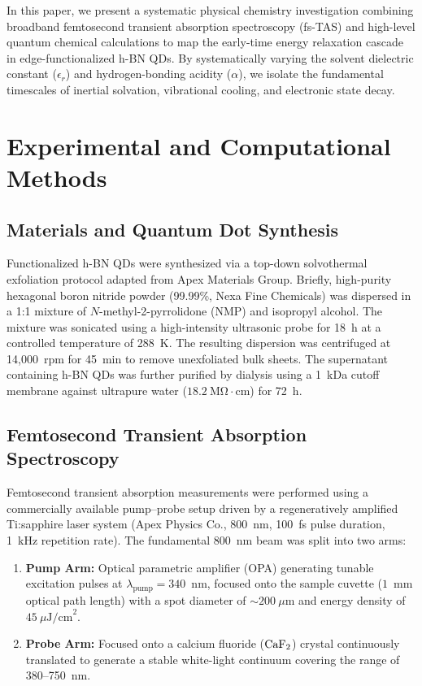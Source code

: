\documentclass[journal=jpcbfk,manuscript=article,layout=twocolumn]{achemso}
\begin{document}
In this paper, we present a systematic physical chemistry investigation combining broadband femtosecond transient absorption spectroscopy (fs-TAS) and high-level quantum chemical calculations to map the early-time energy relaxation cascade in edge-functionalized h-BN QDs. By systematically varying the solvent dielectric constant ($\epsilon_r$) and hydrogen-bonding acidity ($\alpha$), we isolate the fundamental timescales of inertial solvation, vibrational cooling, and electronic state decay.

\section{Experimental and Computational Methods}

\subsection{Materials and Quantum Dot Synthesis}
Functionalized h-BN QDs were synthesized via a top-down solvothermal exfoliation protocol adapted from Apex Materials Group.\cite{Vance2024} Briefly, high-purity hexagonal boron nitride powder (99.99\%, Nexa Fine Chemicals) was dispersed in a 1:1 mixture of $N$-methyl-2-pyrrolidone (NMP) and isopropyl alcohol. The mixture was sonicated using a high-intensity ultrasonic probe for 18~h at a controlled temperature of 288~K. The resulting dispersion was centrifuged at 14,000~rpm for 45~min to remove unexfoliated bulk sheets. The supernatant containing h-BN QDs was further purified by dialysis using a 1~kDa cutoff membrane against ultrapure water ($18.2~\mathrm{M\Omega\cdot cm}$) for 72~h.

\subsection{Femtosecond Transient Absorption Spectroscopy}
Femtosecond transient absorption measurements were performed using a commercially available pump--probe setup driven by a regeneratively amplified Ti:sapphire laser system (Apex Physics Co., 800~nm, 100~fs pulse duration, 1~kHz repetition rate). The fundamental 800~nm beam was split into two arms:
\begin{enumerate}
\item \textbf{Pump Arm:} Optical parametric amplifier (OPA) generating tunable excitation pulses at $\lambda_{\text{pump}} = 340$~nm, focused onto the sample cuvette ($1$~mm optical path length) with a spot diameter of $\sim 200~\mu$m and energy density of $45~\mu\text{J/cm}^2$.
\item \textbf{Probe Arm:} Focused onto a calcium fluoride ($\ce{CaF2}$) crystal continuously translated to generate a stable white-light continuum covering the range of 380--750~nm.
\end{enumerate}
\end{document}
